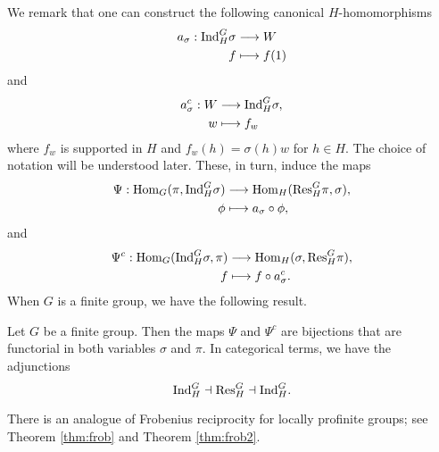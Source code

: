 We remark that one can construct the following canonical $H$-homomorphisms 
\begin{align*}
    a_\sigma: \mathrm{Ind}_H^G\sigma&\longrightarrow W\\
    f&\longmapsto f(1)
\end{align*}
and 
\begin{align*}
    a_\sigma^c: W&\longrightarrow \mathrm{Ind}_H^G\sigma,\\
    w&\longmapsto f_w
\end{align*}
where $f_w$ is supported in $H$ and $f_w(h)=\sigma(h)w$ for $h\in H$. The choice of notation will be understood later. These, in turn, induce the maps 
\begin{align*}
    \Psi:\mathrm{Hom}_G(\pi,\mathrm{Ind}_H^G\sigma)&\longrightarrow\mathrm{Hom}_H(\mathrm{Res}_H^G\pi,\sigma),\\
    \phi&\longmapsto a_\sigma\circ\phi,
\end{align*}
and
\begin{align*}
    \Psi^c:\mathrm{Hom}_G(\mathrm{Ind}_H^G\sigma,\pi)&\longrightarrow\mathrm{Hom}_H(\sigma,\mathrm{Res}_H^G\pi),\\
    f&\longmapsto f\circ a_\sigma^c.
\end{align*}
When $G$ is a finite group, we have the following result.
\begin{thm}
    Let $G$ be a finite group. Then the maps $\Psi$ and $\Psi^c$ are bijections that are functorial in both variables $\sigma$ and $\pi$. In categorical terms, we have the adjunctions $$\mathrm{Ind}_H^G\dashv\mathrm{Res}_H^G\dashv\mathrm{Ind}_H^G.$$
\end{thm}

There is an analogue of Frobenius reciprocity for locally profinite groups; see Theorem \ref{thm:frob} and Theorem \ref{thm:frob2}.